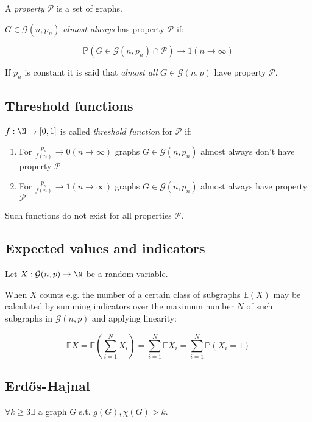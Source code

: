 \spacing

A \emph{property} $\mathcal{P}$ is a set of graphs.

$G \in \mathcal{G}(n,p_n)$ \emph{almost always} has property $\mathcal{P}$ if:

$$\mathbb{P}(G \in \mathcal{G}(n,p_n) \cap \mathcal{P}) \to 1 (n \to \infty)$$

If $p_n$ is constant it is said that \emph{almost all} $G \in \mathcal{G}(n,p)$ have property $\mathcal{P}$.

\subsection*{Threshold functions}

$f : \N \to [0,1]$ is called \emph{threshold function} for $\mathcal{P}$ if:

\begin{enumerate}
	\item For $\frac{p_n}{f(n)} \to 0 (n \to \infty)$ graphs $G \in \mathcal{G}(n,p_n)$ almost always don't have property $\mathcal{P}$
	\item For $\frac{p_n}{f(n)} \to 1 (n \to \infty)$ graphs $G \in \mathcal{G}(n,p_n)$ almost always have property $\mathcal{P}$
\end{enumerate}

Such functions do not exist for all properties $\mathcal{P}$.

\subsection*{Expected values and indicators}

Let $X : \mathcal{G}(n,p) \to \N$ be a random variable.

When $X$ counts e.g. the number of a certain class of subgraphs $\mathbb{E}(X)$ may be calculated by summing indicators over the maximum number $N$ of such subgraphs in $\mathcal{G}(n,p)$ and applying linearity:

\vspace*{-4mm}
$$\mathbb{E}X = \mathbb{E}\left(\sum_{i=1}^N X_i\right) = \sum_{i=1}^N \mathbb{E}X_i = \sum_{i=1}^N \mathbb{P}(X_i=1)$$

\subsection*{Erd\H{o}s-Hajnal}

$\forall k \geq 3 \exists$ a graph $G$ s.t. $g(G), \chi(G) > k$.

